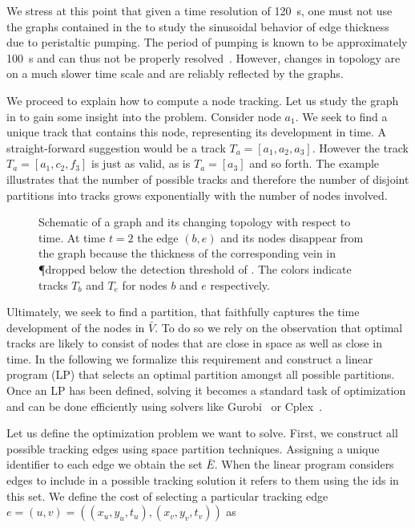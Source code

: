 		We stress at this point that given a time resolution of \SI{120}{\second}, one must not use the graphs contained in the \data to study the sinusoidal behavior of edge thickness due to peristaltic pumping. The period of pumping is known to be approximately \SI{100}{\second} and can thus not be properly resolved~\cite{stewart1959protoplasmic}. However, changes in topology are on a much slower time scale and are reliably reflected by the graphs.

		We proceed to explain how to compute a node tracking. Let us study the graph in  to gain some insight into the problem. Consider \eg node $a_1$. We seek to find a unique track that contains this node, representing its development in time. A straight-forward suggestion would be a track $T_a = [a_1,a_2,a_3]$. However the track $T_a = [a_1,c_2,f_3]$ is just as valid, as is $T_a = [a_3]$ and so forth. The example illustrates that the number of possible tracks and therefore the number of disjoint partitions into tracks grows exponentially with the number of nodes involved. 


		\begin{figure}
		
		
		
		\caption[Schematic description of node tracking]{Schematic of a graph and its changing topology with respect to time. At time $t=2$ the edge $(b,e)$ and its nodes disappear from the graph because the thickness of the corresponding vein in \P dropped below the detection threshold of \NEFI. The colors indicate tracks $T_b$ and $T_e$ for nodes $b$ and $e$ respectively.}
		\label{fig:tracking}
		\end{figure}

		Ultimately, we seek to find a partition, that faithfully captures the time development of the nodes in $\bar{V}$. To do so we rely on the observation that optimal tracks are likely to consist of nodes that are close in space as well as close in time. In the following we formalize this requirement and construct a linear program (LP) that selects an optimal partition amongst all possible partitions. Once an LP has been defined, solving it becomes a standard task of optimization and can be done efficiently using solvers like Gurobi~\cite{optimization2012gurobi} or Cplex~\cite{cplex2005high}.

		Let us define the optimization problem we want to solve. First, we construct all possible tracking edges using space partition techniques. Assigning a unique identifier to each edge we obtain the set $\bar{E}$. When the linear program considers edges to include in a possible tracking solution it refers to them using the ids in this set. We define the cost of selecting a particular tracking edge $e = (u,v) = ((x_u,y_u,t_u), (x_v,y_v,t_v))$ as


